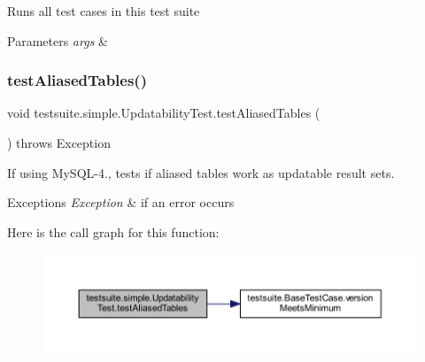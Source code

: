 Runs all test cases in this test suite


\begin{DoxyParams}{Parameters}
{\em args} & \\
\hline
\end{DoxyParams}
\mbox{\label{classtestsuite_1_1simple_1_1_updatability_test_a711d84fccc5379fc8389127a54893e15}} 
\subsubsection{\texorpdfstring{test\+Aliased\+Tables()}{testAliasedTables()}}
{\footnotesize\ttfamily void testsuite.\+simple.\+Updatability\+Test.\+test\+Aliased\+Tables (\begin{DoxyParamCaption}{ }\end{DoxyParamCaption}) throws Exception}

If using My\+S\+Q\+L-\/4., tests if aliased tables work as updatable result sets.


\begin{DoxyExceptions}{Exceptions}
{\em Exception} & if an error occurs \\
\hline
\end{DoxyExceptions}
Here is the call graph for this function\+:
\nopagebreak
\begin{figure}[H]
\begin{center}
\leavevmode
\includegraphics[width=350pt]{classtestsuite_1_1simple_1_1_updatability_test_a711d84fccc5379fc8389127a54893e15_cgraph}
\end{center}
\end{figure}
\mbox{\label{classtestsuite_1_1simple_1_1_updatability_test_ac636788ee577887fe30ac0119eaba824}} 
